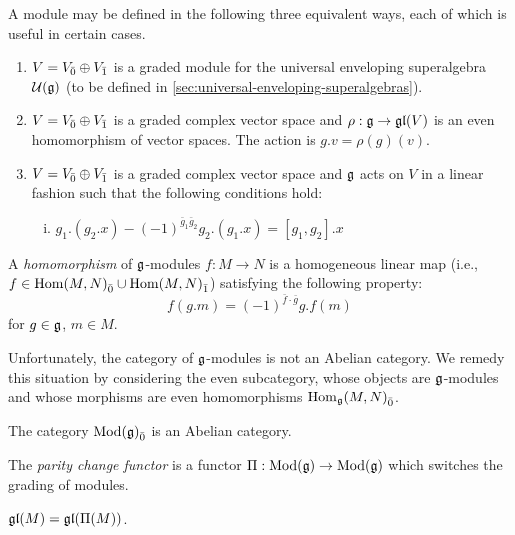 \begin{definition}
  A module may be defined in the following three equivalent ways, each of which is useful in certain cases.
  \begin{enumerate}
  \item $V = {V}_{\bar{0}} \oplus {V}_{\bar{1}}$ is a graded module for the universal enveloping superalgebra $\mathcal{U}(\mathfrak{g})$ (to be defined in \ref{sec:universal-enveloping-superalgebras}).
  \item $V = {V}_{\bar{0}} \oplus {V}_{\bar{1}}$ is a graded complex vector space and $\rho : \mathfrak{g} \to \mathfrak{gl}(V)$ is an even homomorphism of vector spaces. The action is $g.v = \rho(g)(v)$.
  \item $V = {V}_{\bar{0}} \oplus {V}_{\bar{1}}$ is a graded complex vector space and $\mathfrak{g}$ acts on $V$ in a linear fashion such that the following conditions hold:
    \begin{enumerate}[(i)]
    \item $g_1.(g_2.x) - (-1)^{\bar g_1 \bar g_2} g_2. (g_1.x) = [g_1,g_2].x$
    \end{enumerate}

  \end{enumerate}
\end{definition}

\begin{definition}
  A \emph{homomorphism} of $\mathfrak{g}$-modules $f: M \to N$ is a homogeneous linear map (i.e., $f \in {\operatorname{Hom}(M,N)}_{\bar{0}} \cup {\operatorname{Hom}(M,N)}_{\bar{1}}$) satisfying the following property:
  \[
    f(g.m) = (-1)^{\bar f \cdot \bar g} g.f(m)
  \]
  for $g \in \mathfrak{g}$, $m \in M$.
\end{definition}

Unfortunately, the category of $\mathfrak{g}$-modules is not an Abelian category. We remedy this situation by considering the even subcategory, whose objects are $\mathfrak{g}$-modules and whose morphisms are even homomorphisms ${\operatorname{Hom}_{\mathfrak{g}}(M,N)}_{\bar{0}}$.

\begin{proposition}
  The category ${\operatorname{Mod}(\mathfrak{g})}_{\bar{0}}$ is an Abelian category.
\end{proposition}

\begin{definition}
  The \emph{parity change functor} is a functor $\Pi: \operatorname{Mod}(\mathfrak{g}) \to \operatorname{Mod}(\mathfrak{g})$ which switches the grading of modules. 
\end{definition}

\begin{proposition}
  $\mathfrak{gl}(M) = \mathfrak{gl}(\Pi(M))$.
\end{proposition}

